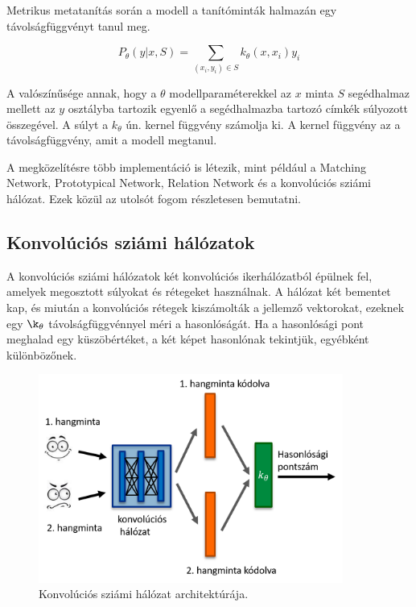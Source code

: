 Metrikus metatanítás során a modell a tanítóminták halmazán egy távolságfüggvényt tanul meg.

\begin{equation} \label{eq:3}
P_{\theta}(y|x, S) = \sum_{(x_i, y_i)\in S} k_{\theta}(x, x_i)y_i
\end{equation}

A valószínűsége annak, hogy a $\theta$ modellparaméterekkel az $x$ minta $S$ segédhalmaz mellett az $y$ osztályba tartozik egyenlő a segédhalmazba tartozó címkék súlyozott összegével. A súlyt a $k_{\theta}$ ún. kernel függvény számolja ki. A kernel függvény az a távolságfüggvény, amit a modell megtanul.

A megközelítésre több implementáció is létezik, mint például a Matching Network, Prototypical Network, Relation Network és a konvolúciós sziámi hálózat. Ezek közül az utolsót fogom részletesen bemutatni.  

\subsection{Konvolúciós sziámi hálózatok}

A konvolúciós sziámi hálózatok két konvolúciós ikerhálózatból épülnek fel, amelyek megosztott súlyokat és rétegeket használnak. A hálózat két bementet kap, és miután a konvolúciós rétegek kiszámolták a jellemző vektorokat, ezeknek egy $\k_{\theta}$ távolságfüggvénnyel méri a hasonlóságát. Ha a hasonlósági pont meghalad egy küszöbértéket, a két képet hasonlónak tekintjük, egyébként különbözőnek.

\begin{figure}[!ht]
	\centering
	\includegraphics[width=100mm, keepaspectratio]{figures/siamese-cnn-arch.png}
	\caption{Konvolúciós sziámi hálózat architektúrája.}
	\label{fig:siamese-cnn-arch}
\end{figure}

